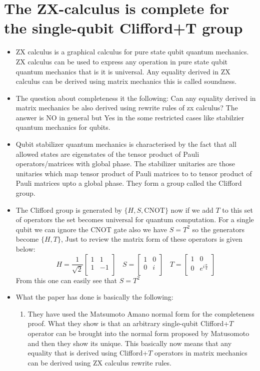 \documentclass{article}
\begin{document}
\section{The ZX-calculus is complete for the single-qubit Clifford+T
group}
\begin{itemize}
\item ZX calculus is a graphical calculus for pure state qubit quantum mechanics. ZX calculus can be used to express any operation in pure state qubit quantum mechanics that is it is universal. Any equality derived in ZX calculus can be derived using matrix mechanics this is called soundness.
\item The question about completeness it the following: Can any equality derived in matrix mechanics be also derived using rewrite rules of zx calculus? The answer is NO in general but Yes in the some restricted cases like stabilzier quantum mechanics for qubits. 
\item Qubit stabilizer quantum mechanics is characterised by the fact that all allowed states are eigenstates of the tensor product of Pauli operators/matrices with global phase. The stabilizer unitaries are those unitaries which map tensor product of Pauli matrices to to tensor product of Pauli matrices upto a global phase. They form a group called the Clifford group.
\item The Clifford group is generated by $\{H,S, \textrm{CNOT}\}$ now if we add $T$ to this set of operators the set becomes universal for quantum computation. For a single qubit we can ignore the CNOT gate also we have $S=T^{2}$ so the generators become $\{H,T\}$, Just to review the matrix form of these operators is given below:
\[
H=\frac{1}{\sqrt{2}}\begin{bmatrix}
1 & 1\\
1 & -1\\
\end{bmatrix}~~~~S=\begin{bmatrix}
1 & 0\\
0 & i\\
\end{bmatrix}~~~~T=\begin{bmatrix}
1 & 0\\
0 & e^{i\frac{\pi}{4}}\\
\end{bmatrix}
\]
From this one can easily see that $S=T^{2}$
\item What the paper has done is basically the following:
\begin{enumerate}
\item They have used the Matsumoto Amano normal form for the completeness proof. What they show is that an arbitrary single-qubit Clifford+$T$ operator can be brought into the normal form proposed by Matusomoto and then they show its unique. This basically now means that any equality that is derived using Clifford+$T$ operators in matrix mechanics can be derived using ZX calculus rewrite rules.

\end{enumerate}
\end{itemize}
\end{document}

